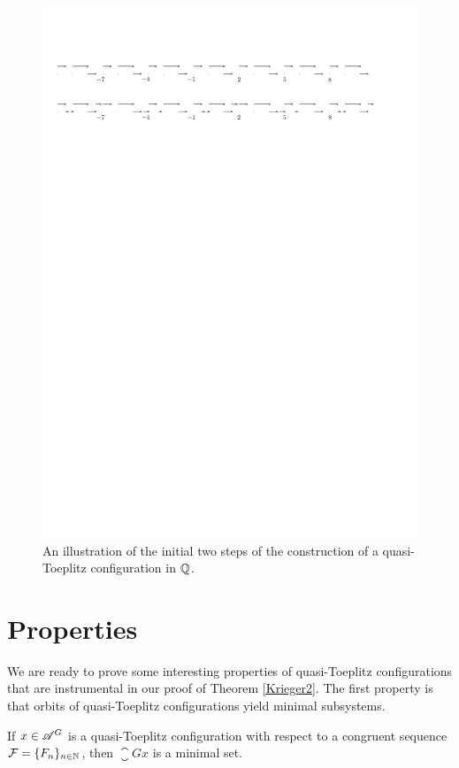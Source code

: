 \begin{figure}
\centering
\includegraphics[scale=0.8]{Graphics/toeplitzQ2}
\caption{An illustration of the initial two steps of the construction of a quasi-Toeplitz configuration in $\mathbb{Q}$. }\label{fig:toeplitzQ}
\end{figure}


\section{Properties}
We are ready to prove some interesting properties of quasi-Toeplitz configurations that are instrumental in our proof of Theorem \ref{Krieger2}. 
%
The first property is that orbits of quasi-Toeplitz configurations yield minimal subsystems.
\begin{lem}\label{lem:toeplitz-minimal}
If $x\in\mathscr{A}^G$ is a quasi-Toeplitz configuration with respect to a congruent \Folner sequence  $\operatorname{\mathcal{F}}=\{F_n\}_{n\in\mathbb{N}}$, then $\closure{Gx}$ is a minimal set.
\end{lem}

